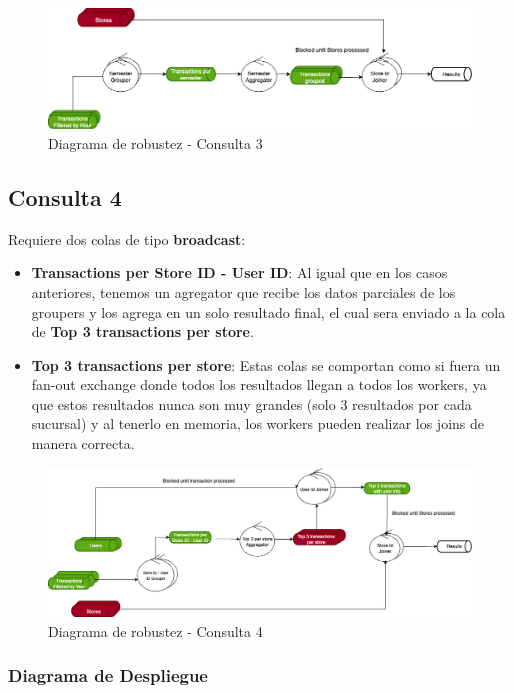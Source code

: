 \documentclass[titlepage,a4paper]{article}
\begin{document}
\begin{figure}[H]
    \centering
    \includegraphics[width=1.0\textwidth]{consulta3.png}
    \caption{Diagrama de robustez - Consulta 3}
\end{figure}

\subsection*{Consulta 4}
Requiere dos colas de tipo \textbf{broadcast}:

\begin{itemize}
    \item \textbf{Transactions per Store ID - User ID}: Al igual que en los casos anteriores, tenemos un agregator que recibe los datos parciales de los groupers y los agrega en un solo resultado final, el cual sera enviado a la cola de \textbf{Top 3 transactions per store}.
    \item \textbf{Top 3 transactions per store}: Estas colas se comportan como si fuera un fan-out exchange donde todos los resultados llegan a todos los workers, ya que estos resultados nunca son muy grandes (solo 3 resultados por cada sucursal) y al tenerlo en memoria, los workers pueden realizar los joins de manera correcta.
\end{itemize}


\begin{figure}[H]
    \centering
    \includegraphics[width=1.0\textwidth]{consulta4.png}
    \caption{Diagrama de robustez - Consulta 4}
\end{figure}

\subsubsection{Diagrama de Despliegue}
\end{document}
